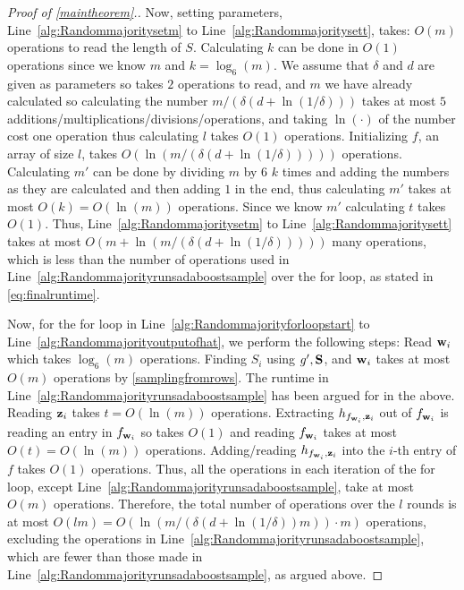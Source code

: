 \begin{proof}[Proof of \cref{maintheorem}.]
Now, setting parameters, Line~\ref{alg:Randommajoritysetm} to Line~\ref{alg:Randommajoritysett}, takes: $O(m)$ operations to read the length of $S$.  
Calculating $ k $ can be done in $ O(1) $ operations since we know $ m $ and $ k=\log_{6}(m) $. We assume that $\delta$ and $d$ are given as parameters so takes $ 2 $ operations to read,  and $m$ we have already calculated so calculating the number $m/(\delta(d+\ln{\left(1/\delta \right)}))$ takes at most $5$ additions/multiplications/divisions/operations, and taking $\ln{\left(\cdot \right)}$ of the number cost one operation thus calculating $ l  $ takes $ O(1) $ operations. Initializing $f$, an array of size $l$, takes $O(\ln{\left(m/(\delta(d+\ln{\left(1/\delta \right)})) \right)})$ operations. Calculating $ m' $ can be done by dividing $ m $ by $ 6 $ $ k $ times and adding the numbers as they are calculated and then adding $ 1  $ in the end, thus calculating $ m' $ takes at most $ O(k)=O(\ln{(m )}) $ operations. Since we know $ m' $ calculating $ t $ takes $ O(1) $. Thus, Line~\ref{alg:Randommajoritysetm} to Line~\ref{alg:Randommajoritysett} takes at most $O\left(m+\ln{\left(m/(\delta(d+\ln{\left(1/\delta \right)})) \right)}  \right)$ many operations, which is less than the number of operations used in Line~\ref{alg:Randommajorityrunsadaboostsample} over the for loop, as stated in \cref{eq:finalruntime}. 

Now, for the for loop in Line~\ref{alg:Randommajorityforloopstart} to Line~\ref{alg:Randommajorityoutputofhat}, we perform the following steps: Read $\mathbf{w}_i$ which takes $\log_{6}(m)$ operations. Finding $S_i$ using $g',\mathbf{S}$, and $\mathbf{w}_i$ takes at most $O(m)$ operations by \cref{samplingfromrows}. The runtime in Line~\ref{alg:Randommajorityrunsadaboostsample} has been argued for in the above. Reading $\mathbf{z}_i$ takes $t=O(\ln{(m)})$ operations. Extracting $h_{f_{\mathbf{w}_{i}},\mathbf{z}_{i}}$ out of $f_{\mathbf{w}_{i}}$ is reading an entry in $f_{\mathbf{w}_{i}}$ so takes $O(1)$ and reading $f_{\mathbf{w}_{i}}$ takes at most $O(t)=O(\ln{\left(m\right)})$ operations. Adding/reading $h_{f_{\mathbf{w}_{i}},\mathbf{z}_{i}}$ into the $i$-th entry of $f$ takes $O(1)$ operations. Thus, all the operations in each iteration of the for loop, except Line~\ref{alg:Randommajorityrunsadaboostsample}, take at most $O(m)$ operations. Therefore, the total number of operations over the $l$ rounds is at most $O(lm)=O(\ln{\left(m/(\delta(d+\ln{\left(1/\delta \right)})m) \right)}\cdot m)$
operations, excluding the operations in Line~\ref{alg:Randommajorityrunsadaboostsample}, which are fewer than those made in Line~\ref{alg:Randommajorityrunsadaboostsample}, as argued above. 


\end{proof}

